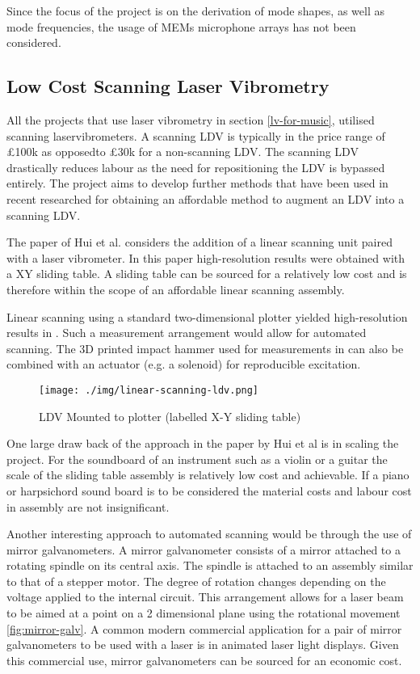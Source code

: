 Since the focus of the project is on the derivation of mode shapes, as well as
mode frequencies, the usage of MEMs microphone arrays has not been considered.


\subsection{Low Cost Scanning Laser Vibrometry}

All the projects that use laser vibrometry in section \ref{lv-for-music}, utilised 
scanning laservibrometers. A scanning LDV is typically in the price range of £100k 
as opposedto £30k for a non-scanning LDV. The scanning LDV drastically reduces labour 
as the need for repositioning the LDV is bypassed entirely. The project aims to
develop further methods that have been used in recent researched for obtaining
an affordable method to augment an LDV into a scanning LDV.

The paper of Hui et al. \cite{HUI} considers the addition of a linear scanning
unit paired with a laser vibrometer. In this paper high-resolution results were
obtained with a XY sliding table. A sliding table can be sourced for a
relatively low cost and is therefore within the scope of an affordable linear
scanning assembly.

Linear scanning using a standard two-dimensional plotter yielded high-resolution
results in \cite{HUI}. Such a measurement arrangement would allow for automated
scanning. The 3D printed impact hammer used for measurements  in \cite{RAU} can
also be combined with an actuator (e.g. a solenoid) for reproducible excitation.

\begin{figure}[h]
\centering
\texttt{[image: ./img/linear-scanning-ldv.png]}
\caption{LDV Mounted to plotter (labelled X-Y sliding table) \cite{HUI}}
\label{fig:ldv-linear-scanner}
\end{figure}

One large draw back of the approach in the paper by Hui et al is in scaling the
project. For the soundboard of an instrument such as a violin or a guitar the
scale of the sliding table assembly is relatively low cost and achievable. If a
piano or harpsichord sound board is to be considered the material costs and
labour cost in assembly are not insignificant. 

Another interesting approach to automated scanning would be through the use of
mirror galvanometers. A mirror galvanometer consists of a mirror attached to a
rotating spindle on its central axis. The spindle is attached to an assembly
similar to that of a stepper motor. The degree of rotation changes depending on
the voltage applied to the internal circuit. This arrangement allows for a laser
beam to be aimed at a point on a 2 dimensional plane using the rotational
movement \ref{fig:mirror-galv}. A common modern commercial application for a
pair of mirror galvanometers to be used with a laser is in animated laser light
displays. Given this commercial use, mirror galvanometers can be sourced for an
economic cost.

